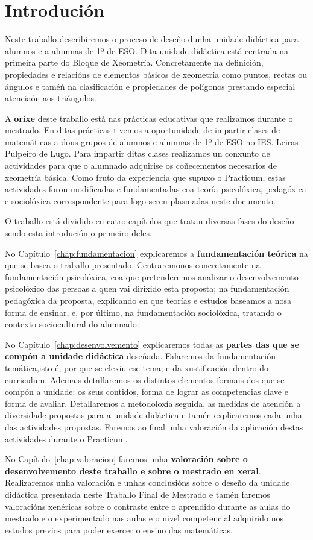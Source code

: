 %

\chapter[Introdución]{Introdución}
Neste traballo describiremos o proceso de deseño dunha unidade didáctica para alumnos e a alumnas de 1º de ESO. Dita unidade didáctica está centrada na primeira parte do Bloque de Xeometría. Concretamente na definición, propiedades e relacións de elementos básicos de xeometría como puntos, rectas ou ángulos e taméń na clasificación e propiedades de polígonos prestando especial atenciaón aos triángulos.

A \textbf{orixe} deste traballo está nas prácticas educativas que realizamos durante o mestrado. En ditas prácticas tivemos a oportunidade de impartir clases de matemáticas a dous grupos de alumnos e alumnas de 1º de ESO no IES. Leiras Pulpeiro de Lugo. Para impartir ditas clases realizamos un conxunto de actividades para que o alumnado adquirise os coñecementos necesarios de xeometría básica. Como fruto da experiencia que supuxo o Practicum, estas actividades foron modificadas e fundamentadas coa teoría psicolóxica, pedagóxica e sociolóxica correspondente para logo seren plasmadas neste documento.

O traballo está dividido en catro capítulos que tratan diversas fases do deseño sendo esta introdución o primeiro deles.

No Capítulo~\ref{chap:fundamentacion} explicaremos a \textbf{fundamentación teórica} na que se basea o traballo presentado. Centraremonos concretamente na fundamentación psicolóxica, coa que pretenderemos analizar o desenvolvemento psicolóxico das persoas a quen vai dirixido esta proposta; na fundamentación pedagóxica da proposta, explicando en que teorías e estudos baseamos a nosa forma de ensinar, e, por último, na fundamentación sociolóxica, tratando o contexto sociocultural do alumnado.

No Capítulo~\ref{chap:desenvolvemento} explicaremos todas as \textbf{partes das que se compón a unidade didáctica} deseñada. Falaremos da fundamentación temática,isto é, por que se elexiu ese tema; e da xustificación dentro do curriculum. Ademais detallaremos os distintos elementos formais dos que se compón a unidade: os seus contidos, forma de lograr as competencias clave e forma de avaliar. Detallaremos a metodoloxía seguida, as medidas de atención a diversidade propostas para a unidade didáctica e tamén explicaremos cada unha das actividades propostas. Faremos ao final unha valoración da aplicación destas actividades durante o Practicum.

No Capítulo~\ref{chap:valoracion} faremos unha \textbf{valoración sobre o desenvolvemento deste traballo e sobre o mestrado en xeral}. Realizaremos unha valoración e unhas conclusións sobre o deseño da unidade didáctica presentada neste Traballo Final de Mestrado e tamén faremos valoracións xenéricas sobre o contraste entre o aprendido durante as aulas do mestrado e o experimentado nas aulas e o nivel competencial adquirido nos estudos previos para poder exercer o ensino das matemáticas.
